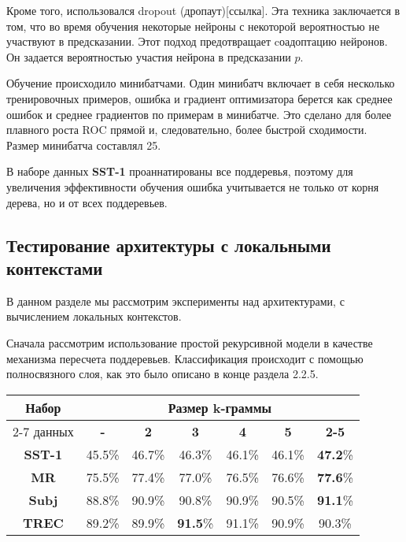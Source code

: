 Кроме того, использовался dropout (дропаут)[ссылка]. 
Эта техника заключается в том, что во время обучения некоторые нейроны с некоторой вероятностью не участвуют в предсказании.
Этот подход предотвращает cоадоптацию нейронов. Он задается вероятностью участия нейрона в предсказании $p$.

Обучение происходило минибатчами. Один минибатч включает в себя несколько тренировочных примеров, ошибка и градиент оптимизатора
берется как среднее ошибок и среднее градиентов по примерам в минибатче. Это сделано для более плавного роста ROC прямой и, следовательно, более быстрой сходимости. Размер минибатча составлял 25.

В наборе данных \textbf{SST-1} проаннатированы все поддеревья, 
поэтому для увеличения эффективности обучения ошибка учитывается не только от корня дерева, но и от всех поддеревьев.

\subsection{Тестирование архитектуры с локальными контекстами}
В данном разделе мы рассмотрим эксперименты над архитектурами, с вычислением локальных контекстов.

Сначала рассмотрим использование простой рекурсивной модели в качестве механизма пересчета поддеревьев.
Классификация происходит с помощью полносвязного слоя, как это было описано в конце раздела 2.2.5.

\vspace{5mm}
\noindent \begin{minipage}{\linewidth}
 \label{tab:title} 
\begin{tabular}{|c|c|c|c|c|c|c|}
\hline
\multirow{2}{*}{Набор} &                \multicolumn{6}{c|}{Размер k-граммы} \\ \cline{2-7} 
     данных            & \textbf{-} & \textbf{2} & \textbf{3} & \textbf{4} & \textbf{5} & \textbf{2-5} \\ \hline
\textbf{SST-1}         & 45.5\%     & 46.7\%     & 46.3\%     & 46.1\%     &  46.1\%    & \textbf{47.2}\% \\ \hline
\textbf{MR}            & 75.5\%     & 77.4\%     & 77.0\%     & 76.5\%     &  76.6\%    & \textbf{77.6}\%  \\ \hline
\textbf{Subj}          & 88.8\%     & 90.9\%     & 90.8\%     & 90.9\%     &  90.5\%    & \textbf{91.1}\% \\ \hline
\textbf{TREC}          & 89.2\%     & 89.9\%     & \textbf{91.5}\%     & 91.1\%     &  90.9\%    & 90.3\% \\ \hline
\end{tabular}
\end{minipage}
\vspace{5mm}

